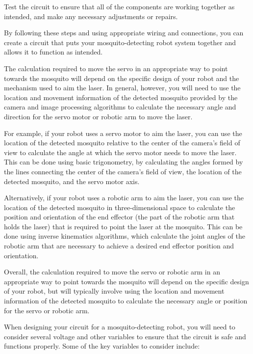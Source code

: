 \documentclass[11pt]{article}
\begin{document}
	Test the circuit to ensure that all of the components are working together as intended, and make any necessary adjustments or repairs.
	
	By following these steps and using appropriate wiring and connections, you can create a circuit that puts your mosquito-detecting robot system together and allows it to function as intended.
	
	
	
	The calculation required to move the servo in an appropriate way to point towards the mosquito will depend on the specific design of your robot and the mechanism used to aim the laser. In general, however, you will need to use the location and movement information of the detected mosquito provided by the camera and image processing algorithms to calculate the necessary angle and direction for the servo motor or robotic arm to move the laser.
	
	For example, if your robot uses a servo motor to aim the laser, you can use the location of the detected mosquito relative to the center of the camera's field of view to calculate the angle at which the servo motor needs to move the laser. This can be done using basic trigonometry, by calculating the angles formed by the lines connecting the center of the camera's field of view, the location of the detected mosquito, and the servo motor axis.
	
	Alternatively, if your robot uses a robotic arm to aim the laser, you can use the location of the detected mosquito in three-dimensional space to calculate the position and orientation of the end effector (the part of the robotic arm that holds the laser) that is required to point the laser at the mosquito. This can be done using inverse kinematics algorithms, which calculate the joint angles of the robotic arm that are necessary to achieve a desired end effector position and orientation.
	
	Overall, the calculation required to move the servo or robotic arm in an appropriate way to point towards the mosquito will depend on the specific design of your robot, but will typically involve using the location and movement information of the detected mosquito to calculate the necessary angle or position for the servo or robotic arm.
	
	
	When designing your circuit for a mosquito-detecting robot, you will need to consider several voltage and other variables to ensure that the circuit is safe and functions properly. Some of the key variables to consider include:
	
\end{document}
